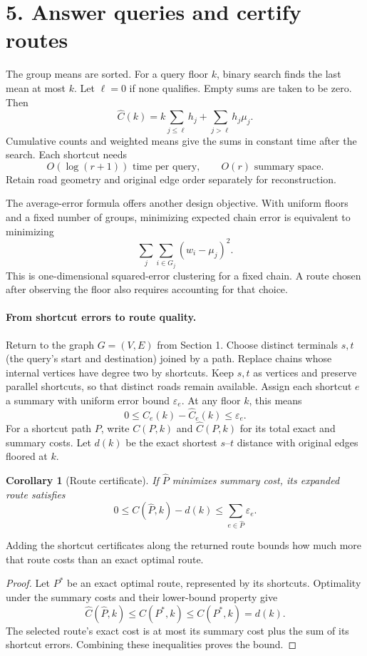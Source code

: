 \documentclass[11pt]{article}
\newtheorem{corollary}[theorem]{Corollary}
\begin{document}
\newpage
\section*{5. Answer queries and certify routes}
\enlargethispage{\baselineskip}
\setlength{\abovedisplayskip}{7pt}
\setlength{\belowdisplayskip}{7pt}
\setlength{\parskip}{2pt}
The group means are sorted. For a query floor $k$, binary search finds
the last mean at most $k$. Let $\ell=0$ if none qualifies. Empty sums
are taken to be zero. Then
\[
 \widehat C(k)=k\sum_{j\le\ell}h_j+\sum_{j>\ell}h_j\mu_j.
\]
Cumulative counts and weighted means give the sums in constant time after
the search. Each shortcut needs
\[
 O(\log(r+1))\text{ time per query},\qquad O(r)\text{ summary space}.
\]
Retain road geometry and original edge order separately for reconstruction.

The average-error formula offers another design objective. With uniform
floors and a fixed number of groups, minimizing expected chain error is
equivalent to minimizing
\[
 \sum_j\sum_{i\in G_j}(w_i-\mu_j)^2.
\]
This is one-dimensional squared-error clustering for a fixed chain. A route
chosen after observing the floor also requires accounting for that choice.

\paragraph{From shortcut errors to route quality.}
Return to the graph $G=(V,E)$ from Section 1. Choose distinct terminals
$s,t$ (the query's start and destination) joined by a path. Replace chains whose internal vertices have degree two
by shortcuts. Keep $s,t$ as vertices and preserve parallel shortcuts, so
that distinct roads remain available. Assign each shortcut $e$ a summary
with uniform error bound $\varepsilon_e$. At any floor $k$, this means
\[
 0\le C_e(k)-\widehat C_e(k)\le\varepsilon_e.
\]
For a shortcut path $P$, write $C(P,k)$ and $\widehat C(P,k)$ for its total
exact and summary costs. Let $d(k)$ be the exact shortest $s$--$t$ distance
with original edges floored at $k$.

\begin{corollary}[Route certificate]
If $\widehat P$ minimizes summary cost, its expanded route satisfies
\[
 0\le C(\widehat P,k)-d(k)\le\sum_{e\in\widehat P}\varepsilon_e.
\]
\end{corollary}
\begin{takeaway}
Adding the shortcut certificates along the returned route bounds how
much more that route costs than an exact optimal route.
\end{takeaway}
\begin{proof}
Let $P^*$ be an exact optimal route, represented by its shortcuts.
Optimality under the summary costs and their lower-bound property give
\[
 \widehat C(\widehat P,k)\le\widehat C(P^*,k)\le C(P^*,k)=d(k).
\]
The selected route's exact cost is at most its summary cost plus the sum
of its shortcut errors. Combining these inequalities proves the bound.
\end{proof}
\end{document}
